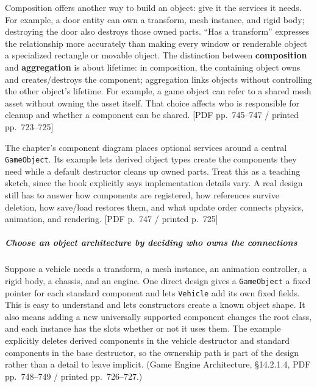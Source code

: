 Composition offers another way to build an object: give it the services it needs. For example, a door entity can own a transform, mesh instance, and rigid body; destroying the door also destroys those owned parts. ``Has a transform'' expresses the relationship more accurately than making every window or renderable object a specialized rectangle or movable object. The distinction between \textbf{composition} and \textbf{aggregation} is about lifetime: in composition, the containing object owns and creates/destroys the component; aggregation links objects without controlling the other object's lifetime. For example, a game object can refer to a shared mesh asset without owning the asset itself. That choice affects who is responsible for cleanup and whether a component can be shared. {[}PDF pp.~745--747 / printed pp.~723--725{]}

The chapter's component diagram places optional services around a central \texttt{GameObject}. Its example lets derived object types create the components they need while a default destructor cleans up owned parts. Treat this as a teaching sketch, since the book explicitly says implementation details vary. A real design still has to answer how components are registered, how references survive deletion, how save/load restores them, and what update order connects physics, animation, and rendering. {[}PDF p.~747 / printed p.~725{]}

\subparagraph{Choose an object architecture by deciding who owns the connections}\label{choose-an-object-architecture-by-deciding-who-owns-the-connections}

Suppose a vehicle needs a transform, a mesh instance, an animation controller, a rigid body, a chassis, and an engine. One direct design gives a \texttt{GameObject} a fixed pointer for each standard component and lets \texttt{Vehicle} add its own fixed fields. This is easy to understand and lets constructors create a known object shape. It also means adding a new universally supported component changes the root class, and each instance has the slots whether or not it uses them. The example explicitly deletes derived components in the vehicle destructor and standard components in the base destructor, so the ownership path is part of the design rather than a detail to leave implicit. (Game Engine Architecture, §14.2.1.4, PDF pp.~748--749 / printed pp.~726--727.)

